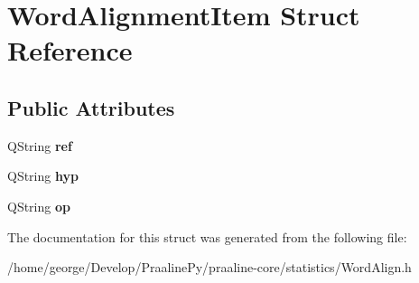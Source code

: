 \hypertarget{struct_word_alignment_item}{}\section{Word\+Alignment\+Item Struct Reference}
\label{struct_word_alignment_item}
\subsection*{Public Attributes}
\begin{DoxyCompactItemize}
\item 
\mbox{\label{struct_word_alignment_item_a3f650d66c21605e8786286d40f41812c}} 
Q\+String {\bfseries ref}
\item 
\mbox{\label{struct_word_alignment_item_aba85b0a328fb0b95db0a34f65338e57f}} 
Q\+String {\bfseries hyp}
\item 
\mbox{\label{struct_word_alignment_item_a90de4e34db3869698bca71e97b8f6105}} 
Q\+String {\bfseries op}
\end{DoxyCompactItemize}


The documentation for this struct was generated from the following file\+:\begin{DoxyCompactItemize}
\item 
/home/george/\+Develop/\+Praaline\+Py/praaline-\/core/statistics/Word\+Align.\+h\end{DoxyCompactItemize}
